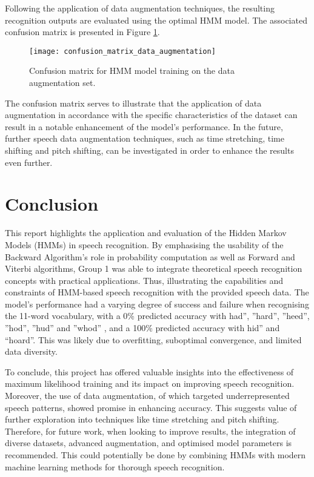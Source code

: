 \documentclass{article}
\begin{document}
Following the application of data augmentation techniques, the resulting recognition outputs are evaluated using the optimal HMM model. The associated confusion matrix is presented in Figure \ref{fig:confusion-matrix-augmentation}.

\begin{figure}[!h]
\begin{center}
\texttt{[image: confusion\_matrix\_data\_augmentation]}
\end{center}
\caption{\label{fig:confusion-matrix-augmentation} Confusion matrix for HMM model training on the data augmentation set.}
\end{figure}

The confusion matrix serves to illustrate that the application of data augmentation in accordance with the specific characteristics of the dataset can result in a notable enhancement of the model's performance. In the future, further speech data augmentation techniques, such as time stretching, time shifting and pitch shifting, can be investigated in order to enhance the results even further.


\section{Conclusion}

This report highlights the application and evaluation of the Hidden Markov Models (HMMs) in speech recognition. By emphasising the usability of the Backward Algorithm’s role in probability computation as well as Forward and Viterbi algorithms, Group 1 was able to integrate theoretical speech recognition concepts with practical applications. Thus, illustrating the capabilities and constraints of HMM-based speech recognition with the provided speech data. The model’s performance had a varying degree of success and failure when recognising the 11-word vocabulary, with a 0\% predicted accuracy with had”, ”hard”, ”heed”, ”hod”, ”hud” and ”whod” , and a 100\% predicted accuracy with hid” and “hoard”. This was likely due to overfitting, suboptimal convergence, and limited data diversity. 

To conclude, this project has offered valuable insights into the effectiveness of maximum likelihood training and its impact on improving speech recognition. Moreover, the use of data augmentation, of which targeted underrepresented speech patterns, showed promise in enhancing accuracy. This suggests value of further exploration into techniques like time stretching and pitch shifting. Therefore, for future work, when looking to improve results, the integration of diverse datasets, advanced augmentation, and optimised model parameters is recommended. This could potentially be done by combining HMMs with modern machine learning methods for thorough speech recognition.
\end{document}
